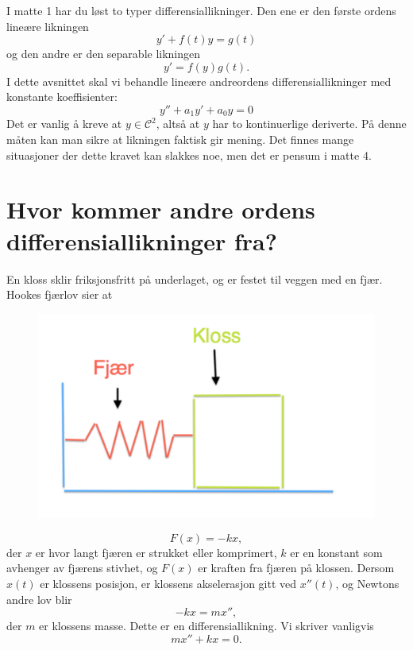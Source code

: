 

\label{ch:andre-ordens-lineare-differensiallikninger}


I matte 1 har du løst to typer differensiallikninger. Den ene er den første ordens lineære likningen
\[
y'+f(t)y=g(t)
\]
og den andre er den separable likningen
\[
y'=f(y)g(t).
\]
I dette avsnittet skal vi behandle lineære andreordens differensiallikninger med konstante koeffisienter:
\[
y''+a_1y'+a_0y=0
\]
Det er vanlig å kreve at $y \in \mathcal C^2$, altså at $y$ har to kontinuerlige deriverte. 
På denne måten kan man sikre at likningen faktisk gir mening. 
Det finnes mange situasjoner der dette kravet kan slakkes noe, 
men det er pensum i matte 4.  







\section*{Hvor kommer andre ordens differensiallikninger fra?}
En kloss sklir friksjonsfritt p{\aa} underlaget, og er festet til veggen med en fj{\ae}r. Hookes fj{\ae}rlov sier at 
\begin{figure}[htbp]
  \begin{center}
	\includegraphics[scale=.35]{Hooke.pdf}
	\label{fig:Num1}
	\end{center}
\end{figure}
\[
F(x)=-kx,
\]
der $x$ er hvor langt fj{\ae}ren er strukket eller komprimert, 
$k$ er en konstant som avhenger av fj{\ae}rens stivhet, 
og $F(x)$ er kraften fra fj{\ae}ren p{\aa} klossen. 
Dersom $x(t)$ er klossens posisjon, er klossens akselerasjon gitt ved $x''(t)$,
og Newtons andre lov blir
\begin{equation*}
-kx=mx'',
\end{equation*}
der $m$ er klossens masse. Dette er en differensiallikning. Vi skriver vanligvis
\[
mx''+kx=0.
\]

